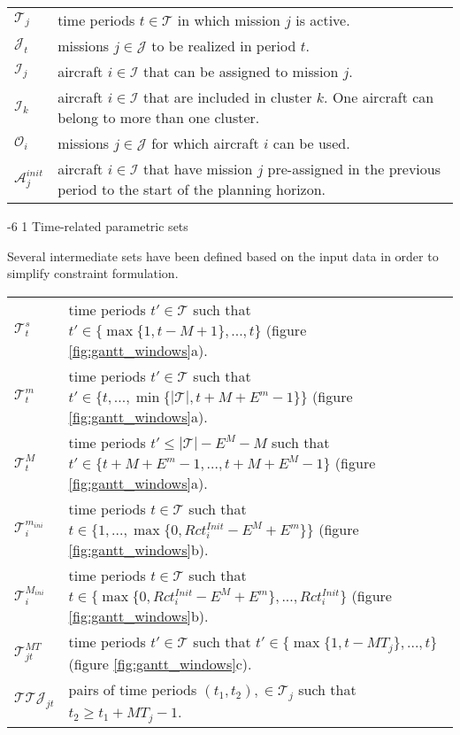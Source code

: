 \documentclass[a4paper,onecolumn,fleqn]{article}
\makeatletter
\renewcommand\subsubsection{\@startsection{subsubsection}{3}{\z@}%
                       {-6\p@ \@plus -0\p@ \@minus -0\p@}%
                       {1\p@ \@plus 0\p@ \@minus 0\p@}%
                       {\normalsize\itshape\bfseries}}
\makeatother
\begin{document}
        \begin{tabular}{p{5mm}p{120mm}}
            $\mathcal{T}_j$     &  time periods $t \in \mathcal{T}$ in which mission $j$ is active. \\
            $\mathcal{J}_t $    &  missions $j \in \mathcal{J}$ to be realized in period $t$. \\
            $\mathcal{I}_j$     &  aircraft $i \in \mathcal{I}$ that can be assigned to mission $j$. \\
            $\mathcal{I}_k$     &  aircraft $i \in \mathcal{I}$ that are included in cluster $k$. One aircraft can belong to more than one cluster. \\
            $\mathcal{O}_i$     &  missions $j \in \mathcal{J}$ for which aircraft $i$ can be used. \\
            $\mathcal{A}^{init}_j$  & aircraft $i \in \mathcal{I}$ that have mission $j$ pre-assigned in the previous period to the start of the planning horizon. \\
        \end{tabular}

    \subsubsection{Time-related parametric sets}

        Several intermediate sets have been defined based on the input data in order to simplify constraint formulation.

        \begin{tabular}{p{8mm}p{117mm}}
            $\mathcal{T}^s_t$ &  time periods $t' \in \mathcal{T}$ such that $t' \in \{ \max{\{1, t - M+1\}},  ..., {t}\}$ (figure \ref{fig:gantt_windows}a). \\
            $\mathcal{T}^m_t$ &  time periods $t' \in \mathcal{T}$ such that $t' \in \{ {t}, ..., \min{\{|\mathcal{T}|, t + M + E^m-1\}}\}$ (figure \ref{fig:gantt_windows}a). \\
            $\mathcal{T}^M_t$ &  time periods $t' \leq |\mathcal{T}| - E^M - M$ such that $t' \in \{ t + M + E^m-1 , ...,  t + M + E^M-1 \}$ (figure \ref{fig:gantt_windows}a). \\
            $\mathcal{T}^{m_{ini}}_i$ &  time periods $t \in \mathcal{T}$ such that $t \in \{ 1, ..., \max{\{0, Rct^{Init}_i - E^M + E^m \}}\}$ (figure \ref{fig:gantt_windows}b). \\
            $\mathcal{T}^{M_{ini}}_i$ &  time periods $t \in \mathcal{T}$ such that $t \in \{ \max{\{0, Rct^{Init}_i - E^M + E^m \}} , ...,  Rct^{Init}_i \}$ (figure \ref{fig:gantt_windows}b). \\
            $\mathcal{T}^{MT}_{jt}$ &  time periods $t' \in \mathcal{T}$ such that $t' \in \{ \max{\{1, t - MT_j\}},  ..., {t}\}$ (figure \ref{fig:gantt_windows}c). \\
            $\mathcal{T}\mathcal{T}\mathcal{J}_{jt}$ & pairs of time periods $(t_1, t_2), \in \mathcal{T}_j$ such that $t_2 \ge t_1 + MT_j-1$. \\
        \end{tabular}
\end{document}
